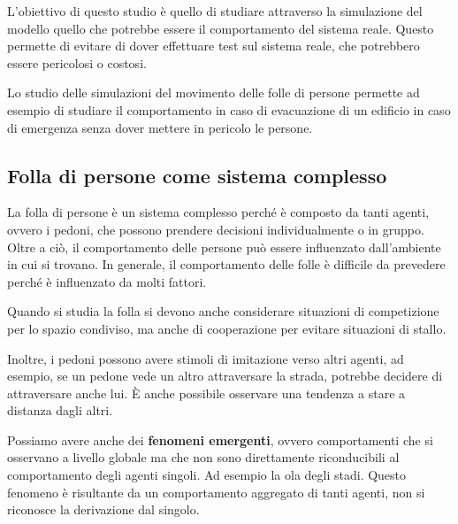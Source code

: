L'obiettivo di questo studio è quello di studiare attraverso la simulazione del
modello quello che potrebbe essere il comportamento del sistema reale. Questo
permette di evitare di dover effettuare test sul sistema reale, che potrebbero
essere pericolosi o costosi.
\begin{esempio}
      Lo studio delle simulazioni del movimento delle folle di persone permette
      ad esempio di studiare il comportamento in caso di evacuazione di un edificio
      in caso di emergenza senza dover mettere in pericolo le persone.
\end{esempio}
\subsection{Folla di persone come sistema complesso}
La folla di persone è un sistema complesso perché è composto da tanti agenti,
ovvero i pedoni, che possono prendere decisioni individualmente o in gruppo. Oltre
a ciò, il comportamento delle persone può essere influenzato dall'ambiente in
cui si trovano. In generale, il comportamento delle folle è difficile da prevedere
perché è influenzato da molti fattori.

Quando si studia la folla si devono anche considerare situazioni di competizione
per lo spazio condiviso, ma anche di cooperazione per evitare situazioni di
stallo.

Inoltre, i pedoni possono avere stimoli di imitazione verso altri agenti, ad
esempio, se un pedone vede un altro attraversare la strada, potrebbe decidere
di attraversare anche lui. È anche possibile osservare una tendenza a stare a
distanza dagli altri.

Possiamo avere anche dei \textbf{fenomeni emergenti}, ovvero comportamenti che
si osservano a livello globale ma che non sono direttamente riconducibili al
comportamento degli agenti singoli. Ad esempio la ola degli stadi. Questo fenomeno
è risultante da un comportamento aggregato di tanti agenti, non si riconosce la
derivazione dal singolo.
